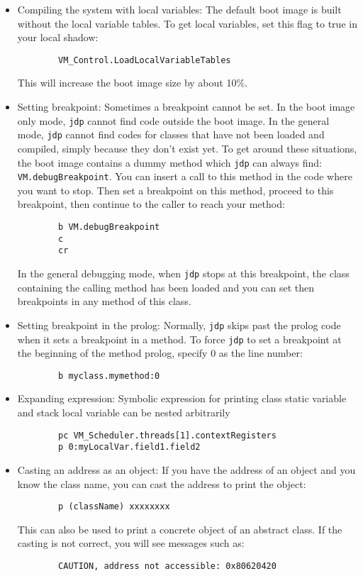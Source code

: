 \begin{itemize}
\item Compiling the system with local variables:
  The default boot image is built without the local variable tables.
  To get local variables, set this flag to true in your local shadow:
\begin{verbatim}
        VM_Control.LoadLocalVariableTables
\end{verbatim}
  This will increase the boot image size by about 10\%.

\item Setting breakpoint:
  Sometimes a breakpoint cannot be set.  In the boot image only mode, {\tt jdp}
  cannot find code outside the boot image.  In the general mode, {\tt jdp} cannot
  find codes for classes that have not been loaded and compiled, simply
  because they don't exist yet.  To get around these
  situations, the boot image contains a dummy method which {\tt jdp} can always
  find:
        {\tt VM.debugBreakpoint}.  
  You can insert a call to this method in the code where you want to stop.
  Then set a breakpoint on this method, proceed to this breakpoint, then
  continue to the caller to reach your method:
\begin{verbatim}
        b VM.debugBreakpoint
        c
        cr
\end{verbatim}
  In the general debugging mode, when {\tt jdp} stops at this breakpoint, the 
  class containing the calling method has been loaded and you can set then
  breakpoints in any method of this class.


\item Setting breakpoint in the prolog:
  Normally, {\tt jdp} skips past the prolog code when it sets a breakpoint in
  a method.  To force {\tt jdp} to set a breakpoint at the beginning of the
  method prolog, specify 0 as the line number:
\begin{verbatim}
        b myclass.mymethod:0
\end{verbatim}


\item Expanding expression:
  Symbolic expression for printing class static variable and stack local
  variable can be nested arbitrarily
\begin{verbatim}
        pc VM_Scheduler.threads[1].contextRegisters
        p 0:myLocalVar.field1.field2
\end{verbatim}


\item Casting an address as an object:
  If you have the address of an object and you know the class name,
  you can cast the address to print the object:
\begin{verbatim}
        p (className) xxxxxxxx
\end{verbatim}
  This can also be used to print a concrete object of an abstract class.
  If the casting is not correct, you will see messages such as:
\begin{verbatim}
        CAUTION, address not accessible: 0x80620420
\end{verbatim}



\end{itemize}
